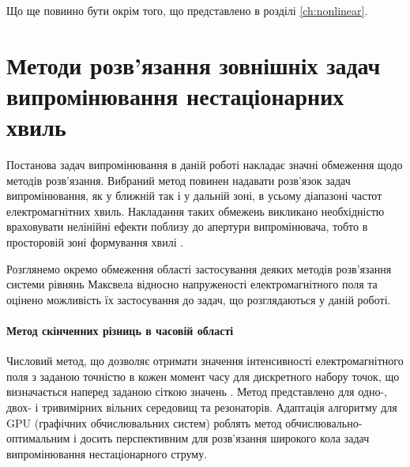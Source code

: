 Що ще повинно бути окрім того, що представлено в розділі \ref{ch:nonlinear}.

\section{Методи розв'язання зовнішніх задач випромінювання нестаціонарних хвиль}


Постанова задач випромінювання в даній роботі накладає значні обмеження щодо 
методів розв'язання. Вибраний метод повинен надавати розв'язок задач 
випромінювання, як у ближній так і у дальній зоні, в усьому діапазоні 
частот електромагнітних хвиль. Накладання таких обмежень викликано
необхідністю враховувати нелінійні ефекти поблизу до апертури випромінювача, 
тобто в просторовій зоні формування хвилі \cite{imp:BaumUWBSP1}.



Розглянемо окремо обмеження області застосування деяких методів 
розв'язання системи рівнянь Максвела відносно напруженості 
електромагнітного поля та оцінено можливість їх застосування до задач, 
що розглядаються у даній роботі.

\paragraph{Метод скінченних різниць в часовій області}

Числовий метод, що дозволяє отримати значення інтенсивності електромагнітного 
поля з заданою точністю в кожен момент часу для дискретного набору точок, що
визначається наперед заданою сіткою значень \cite{imp:FDTD1966}. Метод 
представлено для одно-, двох- і тривимірних \cite{imp:FDTD1975} вільних 
середовищ та резонаторів. Адаптація алгоритму для GPU (графічних 
обчислювальних систем) \cite{imp:FDTD2011} роблять метод 
обчислювально-оптимальним і досить перспективним для розв'язання 
широкого кола задач випромінювання нестаціонарного струму.

